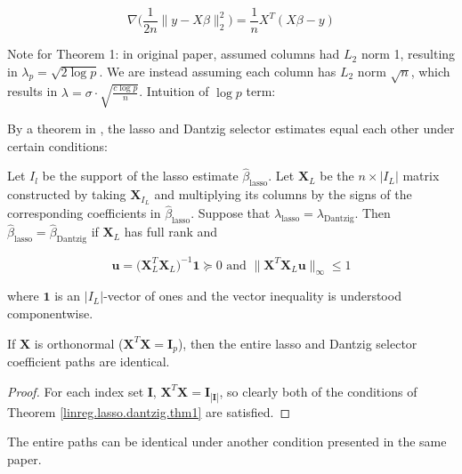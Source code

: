 \[
 \nabla \bigg( \frac{1}{2n} \lVert y - X \beta \rVert_2^2  \bigg) = \frac{1}{n} X^T (X \beta - y)
\]

Note for Theorem 1: in original paper, assumed columns had \(L_2\) norm 1, resulting in \(\lambda_p = \sqrt{2 \log p}\). We are instead assuming each column has \(L_2\) norm \(\sqrt{n}\), which results in \(\lambda = \sigma \cdot \sqrt{\frac{c \log p}{n}}\). Intuition of \(\log p\) term: 


By a theorem in \citet{James2009}, the lasso and Dantzig selector estimates equal each other under certain conditions:

\begin{theorem}\label{linreg.lasso.dantzig.thm1} Let \(I_l\) be the support of the lasso estimate \(\hat{\beta}_{\text{lasso}}\). Let \(\boldsymbol{X}_L\) be the \(n \times | I_L|\) matrix constructed by taking \(\boldsymbol{X}_{I_L}\) and multiplying its columns by the signs of the corresponding coefficients in \(\hat{\beta}_{\text{lasso}}\). Suppose that \(\lambda_{\text{lasso}} = \lambda_{\text{Dantzig}}\). Then \(\hat{\beta}_{\text{lasso}} = \hat{\beta}_{\text{Dantzig}}\) if \(\boldsymbol{X}_L\) has full rank and 

\[
\boldsymbol{u} = \big( \boldsymbol{X}_L^T \boldsymbol{X}_L \big)^{-1} \boldsymbol{1} \succeq 0 \text{ and } \lVert \boldsymbol{X}^T \boldsymbol{X}_L \boldsymbol{u} \rVert_\infty \leq 1
\]

where \(\boldsymbol{1} \) is an \(| I_L|\)-vector of ones and the vector inequality is understood componentwise.

\end{theorem}

\begin{corollary} If \(\boldsymbol{X}\) is orthonormal (\(\boldsymbol{X}^T \boldsymbol{X} = \boldsymbol{I}_p\)), then the entire lasso and Dantzig selector coefficient paths are identical.

\end{corollary}

\begin{proof} For each index set \(\boldsymbol{I}\), \(\boldsymbol{X}^T \boldsymbol{X} = \boldsymbol{I}_{| \boldsymbol{I} |}\), so clearly both of the conditions of Theorem \ref{linreg.lasso.dantzig.thm1} are satisfied.

\end{proof}


The entire paths can be identical under another condition presented in the same paper.

